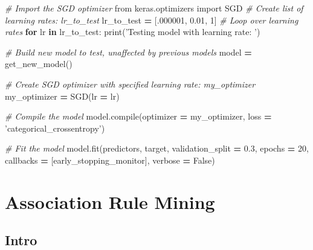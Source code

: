 \documentclass[]{book}
\newenvironment{Shaded}{\begin{snugshade}}{\end{snugshade}}
\newcommand{\KeywordTok}[1]{\textcolor[rgb]{0.13,0.29,0.53}{\textbf{#1}}}
\newcommand{\DecValTok}[1]{\textcolor[rgb]{0.00,0.00,0.81}{#1}}
\newcommand{\FloatTok}[1]{\textcolor[rgb]{0.00,0.00,0.81}{#1}}
\newcommand{\StringTok}[1]{\textcolor[rgb]{0.31,0.60,0.02}{#1}}
\newcommand{\ImportTok}[1]{#1}
\newcommand{\CommentTok}[1]{\textcolor[rgb]{0.56,0.35,0.01}{\textit{#1}}}
\newcommand{\VariableTok}[1]{\textcolor[rgb]{0.00,0.00,0.00}{#1}}
\newcommand{\ControlFlowTok}[1]{\textcolor[rgb]{0.13,0.29,0.53}{\textbf{#1}}}
\newcommand{\OperatorTok}[1]{\textcolor[rgb]{0.81,0.36,0.00}{\textbf{#1}}}
\newcommand{\BuiltInTok}[1]{#1}
\newcommand{\NormalTok}[1]{#1}
\theoremstyle{definition}
\theoremstyle{definition}
\theoremstyle{definition}
\theoremstyle{remark}
\begin{document}
\begin{Shaded}
\begin{Highlighting}[]
\CommentTok{# Import the SGD optimizer}
\ImportTok{from}\NormalTok{ keras.optimizers }\ImportTok{import}\NormalTok{ SGD}
\CommentTok{# Create list of learning rates: lr_to_test}
\NormalTok{lr_to_test }\OperatorTok{=}\NormalTok{ [.}\DecValTok{000001}\NormalTok{, }\FloatTok{0.01}\NormalTok{, }\DecValTok{1}\NormalTok{]}
\CommentTok{# Loop over learning rates}
\ControlFlowTok{for}\NormalTok{ lr }\KeywordTok{in}\NormalTok{ lr_to_test:}
    \BuiltInTok{print}\NormalTok{(}\StringTok{'Testing model with learning rate: '}\NormalTok{)}
    
    \CommentTok{# Build new model to test, unaffected by previous models}
\NormalTok{    model }\OperatorTok{=}\NormalTok{ get_new_model()}
    
    \CommentTok{# Create SGD optimizer with specified learning rate: my_optimizer}
\NormalTok{    my_optimizer }\OperatorTok{=}\NormalTok{ SGD(lr }\OperatorTok{=}\NormalTok{ lr)}
    
    \CommentTok{# Compile the model}
\NormalTok{    model.}\BuiltInTok{compile}\NormalTok{(optimizer }\OperatorTok{=}\NormalTok{ my_optimizer, loss }\OperatorTok{=} \StringTok{'categorical_crossentropy'}\NormalTok{)}
    
    \CommentTok{# Fit the model}
\NormalTok{    model.fit(predictors, }
\NormalTok{              target, }
\NormalTok{              validation_split }\OperatorTok{=} \FloatTok{0.3}\NormalTok{, }
\NormalTok{              epochs }\OperatorTok{=} \DecValTok{20}\NormalTok{, }
\NormalTok{              callbacks }\OperatorTok{=}\NormalTok{ [early_stopping_monitor], }
\NormalTok{              verbose }\OperatorTok{=} \VariableTok{False}\NormalTok{)}
\end{Highlighting}
\end{Shaded}

\section{Association Rule Mining}\label{association-rule-mining}

\subsection{Intro}\label{intro-18}
\end{document}
